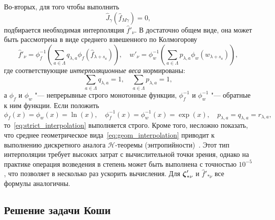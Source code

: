 Во-вторых, для того чтобы выполнить
\begin{equation}\label{eq:strict_interpolation}
    \hat{J}_\gamma\left(\hat{f}_{M\gamma}\right) = 0,
\end{equation}
подбирается необходимая интерполяция \(\hat{f}'_{\nu}\).
В достаточно общем виде, она может быть рассмотрена в виде среднего взвешенного по Колмогорову
\begin{equation}\label{eq:Kolmogorov_mean}
    \hat{f}'_{\nu} = \phi_f^{-1}\left(\sum_{a\in\Lambda} q_{\lambda,a} \phi_f\left(\hat{f}_{\lambda+s_a}\right)\right), \quad
    w'_{\nu} = \phi_w^{-1}\left(\sum_{a\in\Lambda} p_{\lambda,a} \phi_w\left(w_{\lambda+s_a}\right)\right),
\end{equation}
где соответствующие \emph{интерполяционные веса} нормированы:
\begin{equation}\label{eq:normalized_pq}
    \sum_{a\in\Lambda} q_{\lambda,a} = 1, \quad
    \sum_{a\in\Lambda} p_{\lambda,a} = 1,
\end{equation}
а \(\phi_f\) и \(\phi_w\) "--- непрерывные строго монотонные функции,
\(\phi_f^{-1}\) и \(\phi_w^{-1}\) "--- обратные к ним функции.
Если положить
\begin{equation}\label{eq:geom_interpolation}
    \phi_f(x) = \phi_w(x) = \ln(x), \quad \phi_f^{-1}(x) = \phi_w^{-1}(x) = \exp(x), \quad
    p_{\lambda,a} = q_{\lambda,a} = r_{\lambda,a},
\end{equation}
то~\eqref{eq:strict_interpolation} выполняется строго.
Кроме того, несложно показать, что среднее геометрическое вида~\eqref{eq:geom_interpolation}
приводит к выполнению дискретного аналога \(\mathcal{H}\)-теоремы (энтропийности)~\cite{Dodulad2013}.
Этот тип интерполяции требует высоких затрат с вычислительной точки зрения,
однако на практике операция возведения в степень может быть выполнена с точностью \(10^{-5}\),
что позволяет в несколько раз ускорить вычисления.
Для \({\boldsymbol{\zeta}}'_{*\nu}\) и \(\hat{f}'_{*\nu}\) все формулы аналогичны.

\subsection{Решение задачи Коши}

